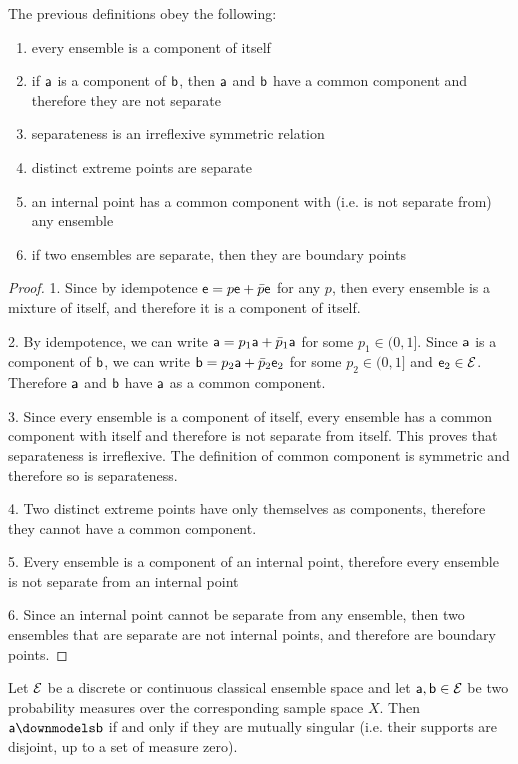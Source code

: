 \begin{mathSection}
\begin{coro}
	The previous definitions obey the following:
	\begin{enumerate}
		\item every ensemble is a component of itself
		\item if $\ens[a]$ is a component of $\ens[b]$, then $\ens[a]$ and $\ens[b]$ have a common component and therefore they are not separate
		\item separateness is an irreflexive symmetric relation
		\item distinct extreme points are separate
		\item an internal point has a common component with (i.e. is not separate from) any ensemble
		\item if two ensembles are separate, then they are boundary points
	\end{enumerate}
\end{coro}

\begin{proof}
	1. Since by idempotence $\ens = p \ens + \bar{p} \ens$ for any $p$, then every ensemble is a mixture of itself, and therefore it is a component of itself.
	
	2. By idempotence, we can write $\ens[a] = p_1 \ens[a] + \bar{p}_1 \ens[a]$ for some $p_1 \in (0,1]$. Since $\ens[a]$ is a component of $\ens[b]$, we can write $\ens[b] = p_2 \ens[a] + \bar{p}_2 \ens[e]_2$ for some $p_2 \in (0, 1]$ and $\ens[e]_2 \in \Ens$. Therefore $\ens[a]$ and $\ens[b]$ have $\ens[a]$ as a common component.
	
	3. Since every ensemble is a component of itself, every ensemble has a common component with itself and therefore is not separate from itself. This proves that separateness is irreflexive. The definition of common component is symmetric and therefore so is separateness.
	
	4. Two distinct extreme points have only themselves as components, therefore they cannot have a common component.
	
	5. Every ensemble is a component of an internal point, therefore every ensemble is not separate from an internal point
	
	6. Since an internal point cannot be separate from any ensemble, then two ensembles that are separate are not internal points, and therefore are boundary points.
\end{proof}

\begin{prop}
	Let $\Ens$ be a discrete or continuous classical ensemble space and let $\ens[a], \ens[b] \in \Ens$ be two probability measures over the corresponding sample space $X$. Then $\ens[a] \separate \ens[b]$ if and only if they are mutually singular (i.e. their supports are disjoint, up to a set of measure zero).
\end{prop}


\end{mathSection}

